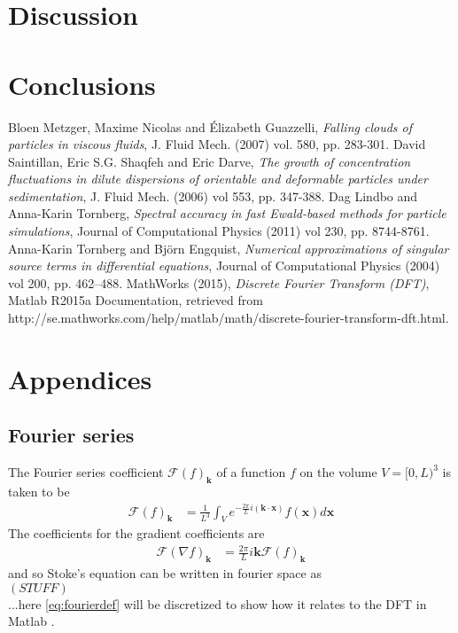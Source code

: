 \documentclass[a4paper,twoside=false,abstract=false,numbers=noenddot,
titlepage=false,headings=small,parskip=half,version=last]{scrartcl}
\begin{document}
\section{Discussion}

\section{Conclusions}

\begin{thebibliography}{1}
		Bloen Metzger, Maxime Nicolas and Élizabeth Guazzelli,
		{\em Falling clouds of particles in viscous fluids},
		J. Fluid Mech. (2007) vol. 580, pp. 283-301.
        David Saintillan, Eric S.G. Shaqfeh and Eric Darve,
        {\em The growth of concentration fluctuations in dilute dispersions of orientable and deformable particles under sedimentation},
        J. Fluid Mech. (2006) vol 553, pp. 347-388.
        Dag Lindbo and Anna-Karin Tornberg,
        {\em Spectral accuracy in fast Ewald-based methods for particle simulations},
        Journal of Computational Physics (2011) vol 230, pp. 8744-8761.
        Anna-Karin Tornberg and Björn Engquist,
        {\em Numerical approximations of singular source terms
in differential equations},
        Journal of Computational Physics (2004) vol 200, pp. 462–488.
        MathWorks (2015),
        {\em Discrete Fourier Transform (DFT)},
        Matlab R2015a Documentation, retrieved from http://se.mathworks.com/help/matlab/math/discrete-fourier-transform-dft.html.
	
\end{thebibliography}

\section{Appendices}
\subsection{Fourier series}
The Fourier series coefficient $\mathcal{F}(f)_{\mathbf{k}}$ of a function $f$ on the volume $V=[0,L)^3$ is taken to be
\begin{align}
\mathcal{F}(f)_{\mathbf{k}} &= \frac{1}{L^3} \int_V e^{-\frac{2\pi}{L}i(\mathbf{k}\cdot \mathbf{x})}f(\mathbf{x})d\mathbf{x}
    \label{eq:fourierdef}
\end{align}
The coefficients for the gradient coefficients are
\begin{align}
\mathcal{F}(\nabla f)_{\mathbf{k}} &= \frac{2\pi}{L}i\mathbf{k} \mathcal{F}(f)_{\mathbf{k}}
\end{align}
and so Stoke's equation can be written in fourier space as \\
$\left(STUFF\right)$\\
...here \eqref{eq:fourierdef} will be discretized to show how it relates to the DFT in Matlab \cite{matlabdft}.
\end{document}
